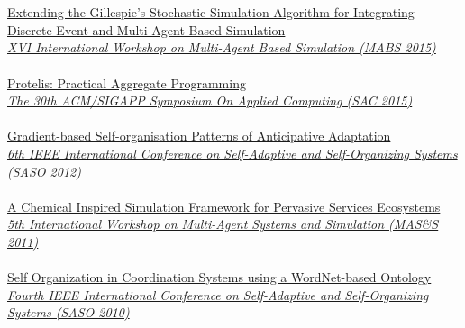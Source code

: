 \\ \halfblankline \\
\href{https://www.slideshare.net/DanySK/extending-the-gillespies-stochastic-simulation-algorithm-for-integrating-discreteevent-and-multiagent-based-simulation}{Extending the Gillespie's Stochastic Simulation Algorithm for Integrating Discrete-Event and Multi-Agent Based Simulation} \\
\href{http://www.springer.com/gp/book/9783319314464}{\textit{XVI International Workshop on Multi-Agent Based Simulation (MABS 2015)}}
\\ \halfblankline \\
\href{https://www.slideshare.net/DanySK/sac-47194849}{Protelis: Practical Aggregate Programming} \\
\href{https://www.sigapp.org/sac/sac2015/}{\textit{The 30th ACM/SIGAPP Symposium On Applied Computing (SAC 2015)}}
\\ \halfblankline \\
\href{https://www.slideshare.net/DanySK/gradientbased-selforganisation-patterns-of-anticipative-adaptation}{Gradient-based Self-organisation Patterns of Anticipative Adaptation} \\
\href{http://saso2012.univ-lyon1.fr/}{\textit{6th IEEE International Conference on Self-Adaptive and Self-Organizing Systems (SASO 2012)}}
\\ \halfblankline \\
\href{http://apice.unibo.it/xwiki/bin/view/Talks/PianiniMass2011}{A Chemical Inspired Simulation Framework for Pervasive Services Ecosystems} \\
\href{https://fedcsis.org/2011/}{\textit{5th International Workshop on Multi-Agent Systems and Simulation (MAS\&S 2011)}}
\\ \halfblankline \\
\href{http://apice.unibo.it/xwiki/bin/view/Talks/PianiniVirrusoSASO10}{Self Organization in Coordination Systems using a WordNet-based Ontology} \\
\href{http://www.inf.u-szeged.hu/projectdirs/saso10/}{\textit{Fourth IEEE International Conference on Self-Adaptive and Self-Organizing Systems (SASO 2010)}}
